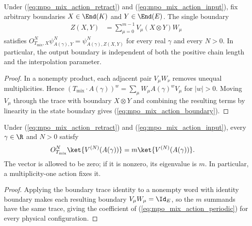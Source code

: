 \begin{lemma}
    \label{thm:mpo_mixed_action_boundary}
    \leanok
    Under (\ref{eq:mpo_mix_action_retract}) and
    (\ref{eq:mpo_mix_action_input}), fix arbitrary boundaries
    $X\in\End(K)$ and $Y\in\End(E)$. The single boundary
    \begin{align}
        Z(X,Y) & =\sum_{\mu=0}^{m-1}V_\mu(X\otimes Y)W_\mu
        \label{eq:mpo_mix_action_boundary}
    \end{align}
    satisfies $O^N_{T_{\mathrm{mix}},X}\psi^N_{A(\gamma),Y}
        =\psi^N_{A(\gamma),Z(X,Y)}$ for every real $\gamma$ and every
    $N>0$. In particular, the output boundary is independent of both
    the positive chain length and the interpolation parameter.
\end{lemma}
\begin{proof}
    \leanok
    In a nonempty product, each adjacent pair $V_\mu W_\nu$ removes
    unequal multiplicities. Hence
    $(T_{\mathrm{mix}}\cdot A(\gamma))^w
        =\sum_\mu W_\mu A(\gamma)^wV_\mu$ for $|w|>0$.
    Moving $V_\mu$ through the trace with boundary $X\otimes Y$
    and combining the resulting terms by linearity in the state boundary
    gives (\ref{eq:mpo_mix_action_boundary}).
\end{proof}

\begin{lemma}
    \label{thm:mpo_mixed_action_periodic}
    \leanok
    Under (\ref{eq:mpo_mix_action_retract}) and
    (\ref{eq:mpo_mix_action_input}), every $\gamma\in\R$ and $N>0$
    satisfy
    \begin{align}
        O^N_{T_{\mathrm{mix}}}\ket{V^{(N)}(A(\gamma))}
         & =m\ket{V^{(N)}(A(\gamma))}.
        \label{eq:mpo_mix_action_periodic}
    \end{align}
    The vector is allowed to be zero; if it is nonzero, its eigenvalue
    is $m$. In particular, a multiplicity-one action fixes it.
\end{lemma}
\begin{proof}
    \leanok
    Applying the boundary trace identity to a nonempty word with identity
    boundary makes each resulting boundary $V_\mu W_\mu=\Id_E$, so the $m$
    summands have the same trace, giving the coefficient of
    (\ref{eq:mpo_mix_action_periodic}) for every physical configuration.
\end{proof}

